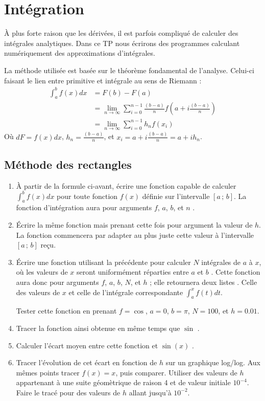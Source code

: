 \section{Intégration}
À plus forte raison que les dérivées, il est parfois compliqué de calculer
des intégrales analytiques. Dans ce TP nous écrirons des programmes
calculant numériquement des approximations d'intégrales.

La méthode utilisée est basée sur le théorème fondamental de l'analyse.
Celui-ci faisant le lien entre primitive et intégrale au sens de Riemann :
\begin{equation}
\begin{split}
\int_a^b f(x)dx &= F(b)-F(a) \\
&= \lim_{n\rightarrow\infty} \sum_{i=0}^{n-1}\frac{(b-a)}{n} f(a+i\frac{(b-a)}{n})\\
&= \lim_{n\rightarrow\infty} \sum_{i=0}^{n-1} h_n f(x_i)
\end{split}
\end{equation}
Où $dF = f(x)dx$, $h_n=\frac{(b-a)}{n}$, et $x_i=a+ i\frac{(b-a)}{n} = a+ih_n$.

\subsection{Méthode des rectangles}
\begin{enumerate}
\item À partir de la formule ci-avant, 
écrire une fonction capable de calculer $\int_a^b f(x)dx$
pour toute fonction $f(x)$ définie sur l'intervalle $[a\,;\,b]$. 
La fonction d'intégration aura pour arguments $f$, $a$, $b$, et $n$ .
\item Écrire la même fonction mais prenant cette fois pour argument la 
valeur de $h$. La fonction commencera par adapter au plus juste 
cette valeur à l'intervalle $[a\,;\,b]$ reçu.
\item Écrire une fonction utilisant la précédente
 pour calculer $N$ intégrales de $a$ à $x$, où les valeurs de $x$
seront uniformément réparties entre $a$ et $b$ . 
Cette fonction
aura donc pour arguments $f$, $a$, $b$, $N$, et $h$ ; elle retournera
deux listes . 
Celle des valeurs de $x$ et celle de l'intégrale correspondante
$\int_a^xf(t)dt$.


Tester 
cette fonction 
en prenant $f=\cos$, $a=0$, $b=\pi$, $N=100$, et $h=0.01$. 
\item Tracer la fonction ainsi obtenue en même temps que $\sin$ .
\item Calculer l'écart moyen entre cette fonction et $\sin(x)$ .
\item Tracer l'évolution de cet écart en fonction de $h$ sur un 
graphique log/log. Aux mêmes points tracer $f(x)=x$, puis comparer. Utiliser des 
valeurs de $h$ appartenant à une suite géomètrique de raison 4 et de valeur initiale $10^{-4}$. Faire le tracé pour des valeurs de $h$ allant jusqu'à $10^{-2}$.
\end{enumerate}

